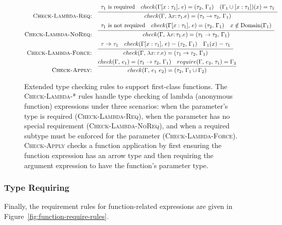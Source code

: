 \documentclass[peerreview, 10pt]{IEEEtran}
\newcommand{\funct}[3]{\ensuremath{\lambda #1\mathsf{:}\,#2.#3}}
\newcommand{\apply}[2]{\ensuremath{#1\ #2}}
\newcommand{\arrowt}[2]{\ensuremath{{#1}\rightarrow{#2}}}
\newcommand{\checktype}[4]{\ensuremath{{check}(#1,\,#2)=(#3,\,#4)}}
\newcommand{\requiretype}[4]{\ensuremath{{require}(#1,\,#2,\,#3)=#4}}
\newcommand{\required}[1]{\ensuremath{#1\text{ is required}}}
\newcommand{\nrequired}[1]{\ensuremath{#1\text{ is not required}}}
\newcommand{\forcerequire}[2]{\ensuremath{#1\Rightarrow#2}}
\begin{document}
\begin{figure*}[ht]
\centering
\begin{framed}
\begin{align*}
\text{\textsc{Check-Lambda-Req:}} &\quad \infer{\checktype{\Gamma}{\funct{x}{\tau_1}{e}}{\arrowt{\tau_1}{\tau_2}}{\Gamma_1}}{
\begin{array}{c}
\required{\tau_1} \quad \checktype{\Gamma[x:\tau_1]}{e}{\tau_2}{\Gamma_1}\quad
(\Gamma_1\cup[x:\tau_1])(x)=\tau_1
\end{array}} \\
\text{\textsc{Check-Lambda-NoReq:}} &\quad \infer{\checktype{\Gamma}{\funct{x}{\tau_1}{e}}{\arrowt{\tau_1}{\tau_2}}{\Gamma_1}}{
\begin{array}{c}
\nrequired{\tau_1} \quad
\checktype{\Gamma[x:\tau_1]}{e}{\tau_2}{\Gamma_1} \quad x \notin \text{Domain}(\Gamma_1)
\end{array}
} \\
\text{\textsc{Check-Lambda-Force:}} &\quad \infer{\checktype{\Gamma}{\funct{x}{\tau}{e}}{\arrowt{\tau_1}{\tau_2}}{\Gamma_1}}{
\begin{array}{c}
\forcerequire{\tau}{\tau_1} \quad \checktype{\Gamma[x:\tau_1]}{e}{\tau_2}{\Gamma_1} \quad \Gamma_1(x) = \tau_1
\end{array}
} \\
\text{\textsc{Check-Apply:}} &\quad \infer{\checktype{\Gamma}{\apply{e_1}{e_2}}{\tau_2}{\Gamma_1 \cup \Gamma_2}}{\checktype{\Gamma}{e_1}{\arrowt{\tau_1}{\tau_2}}{\Gamma_1} \quad \requiretype{\Gamma}{e_2}{\tau_1}{\Gamma_2}}
\end{align*}
\end{framed}
\caption{Extended type checking rules to support first-class functions. The \textsc{Check-Lambda-*} rules handle type checking of lambda (anonymous function) expressions under three scenarios: when the parameter's type is required (\textsc{Check-Lambda-Req}), when the parameter has no special requirement (\textsc{Check-Lambda-NoReq}), and when a required subtype must be enforced for the parameter (\textsc{Check-Lambda-Force}). \textsc{Check-Apply} checks a function application by first ensuring the function expression has an arrow type and then requiring the argument expression to have the function's parameter type.}
\label{fig:function-check-rules}
\end{figure*}

\subsubsection{Type Requiring}
Finally, the requirement rules for function-related expressions are given in Figure~\ref{fig:function-require-rules}.
\end{document}
